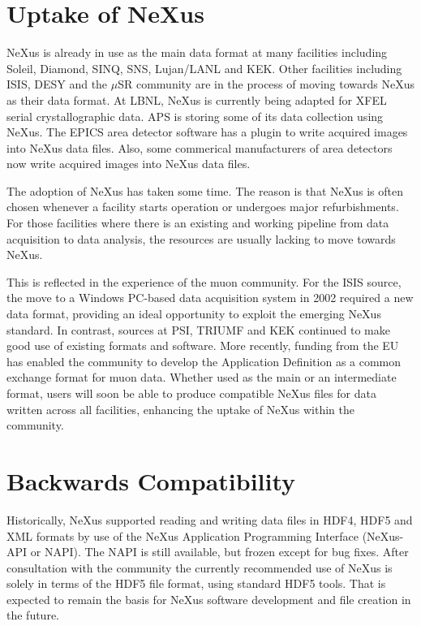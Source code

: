 \documentclass[%
 aip,
rsi,
 amsmath,amssymb,
 reprint,%
]{revtex4-1}
\begin{document}
\section{Uptake of NeXus} 

NeXus is already in use as the main data format at many facilities including Soleil, Diamond, SINQ, SNS, Lujan/LANL 
and KEK. Other facilities including ISIS, DESY and the $\mu$SR community are in the process of moving towards 
NeXus as their data format. At LBNL, NeXus is currently being adapted for XFEL serial crystallographic data. 
APS is storing some of its data collection using NeXus.
The EPICS\cite{epicsad} area detector software has a plugin to write acquired images into NeXus data files.
Also, some commerical manufacturers of area detectors now write acquired images into NeXus data files.

The adoption of NeXus has taken some time. The reason is that NeXus is often chosen whenever 
a facility starts operation or undergoes major refurbishments. For those facilities where there is an existing and working 
pipeline from data acquisition to data analysis,  the resources are usually lacking to move 
towards NeXus.

This is reflected in the experience of the muon community. For the ISIS source, the move to a Windows PC-based data acquisition 
system in 2002 required a new data format, providing an ideal opportunity to exploit the emerging NeXus standard\cite{muon1}. In 
contrast, sources at PSI, TRIUMF and KEK continued to make good use of existing formats and software. More recently, funding 
from the EU has enabled the community to develop the Application Definition as a common exchange format for muon data\cite{muon2}. 
Whether used as the main or an intermediate format, users will soon be able to produce compatible NeXus files for data written 
across all facilities, enhancing the uptake of NeXus within the community.


\section{Backwards Compatibility}

Historically, NeXus supported reading and writing data files in HDF4, HDF5 and
XML formats by use of the NeXus Application Programming Interface
(NeXus-API or NAPI).  The NAPI is still available, but frozen except for bug fixes.
After consultation with the community the currently recommended use of
NeXus is solely in terms of the HDF5 file format, using standard HDF5 tools.
That is expected to remain the basis for NeXus software development and
file creation in the future.
\end{document}
